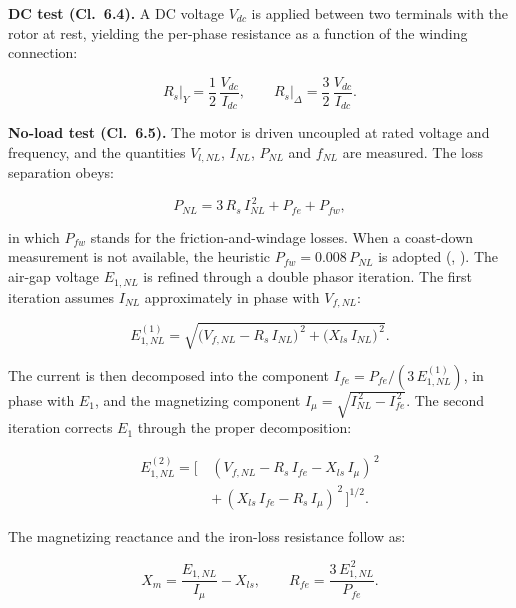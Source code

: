 \textbf{DC test (Cl.~6.4).} A DC voltage $V_{dc}$ is applied between two terminals with the rotor at rest, yielding the per-phase resistance as a function of the winding connection:

\begin{equation}
\label{eq:ieee_rs_en}
R_s\big|_Y = \frac{1}{2}\,\frac{V_{dc}}{I_{dc}}, \qquad R_s\big|_\Delta = \frac{3}{2}\,\frac{V_{dc}}{I_{dc}}.
\end{equation}

\textbf{No-load test (Cl.~6.5).} The motor is driven uncoupled at rated voltage and frequency, and the quantities $V_{l,NL}$, $I_{NL}$, $P_{NL}$ and $f_{NL}$ are measured. The loss separation obeys:

\begin{equation}
\label{eq:ieee_pnl_en}
P_{NL} = 3\,R_s\,I_{NL}^{\,2} + P_{fe} + P_{fw},
\end{equation}

\noindent in which $P_{fw}$ stands for the friction-and-windage losses. When a coast-down measurement is not available, the heuristic $P_{fw} = 0.008\,P_{NL}$ is adopted (\citeauthor{ieee112_2017}, \citeyear{ieee112_2017}). The air-gap voltage $E_{1,NL}$ is refined through a double phasor iteration. The first iteration assumes $I_{NL}$ approximately in phase with $V_{f,NL}$:

\begin{equation}
\label{eq:ieee_e1_iter1_en}
E_{1,NL}^{(1)} = \sqrt{\bigl(V_{f,NL} - R_s\,I_{NL}\bigr)^{\,2} + \bigl(X_{ls}\,I_{NL}\bigr)^{\,2}}.
\end{equation}

\noindent The current is then decomposed into the component $I_{fe} = P_{fe}/(3\,E_{1,NL}^{(1)})$, in phase with $E_1$, and the magnetizing component $I_\mu = \sqrt{I_{NL}^{\,2} - I_{fe}^{\,2}}$. The second iteration corrects $E_1$ through the proper decomposition:

\begin{equation}
\label{eq:ieee_e1_iter2_en}
\begin{split}
E_{1,NL}^{(2)} = \big[\,&(V_{f,NL} - R_s\,I_{fe} - X_{ls}\,I_\mu)^{\,2} \\
&+\, (X_{ls}\,I_{fe} - R_s\,I_\mu)^{\,2}\,\big]^{1/2}.
\end{split}
\end{equation}

\noindent The magnetizing reactance and the iron-loss resistance follow as:

\begin{equation}
\label{eq:ieee_xm_rfe_en}
X_m = \frac{E_{1,NL}}{I_\mu} - X_{ls}, \qquad R_{fe} = \frac{3\,E_{1,NL}^{\,2}}{P_{fe}}.
\end{equation}

